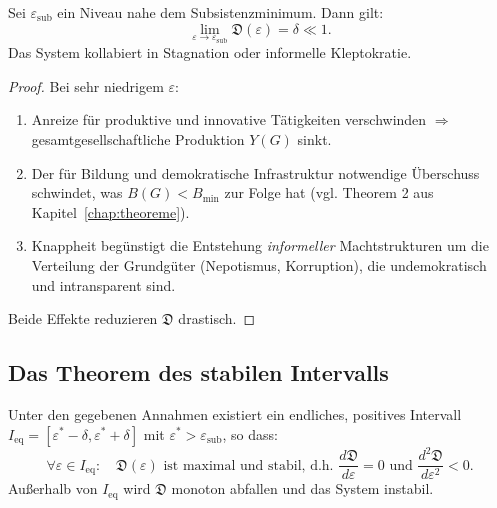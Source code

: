 \begin{theorem}
    Sei $\varepsilon_{\text{sub}}$ ein Niveau nahe dem Subsistenzminimum. Dann gilt:
    \[
    \lim_{\varepsilon \to \varepsilon_{\text{sub}}} \mathfrak{D}(\varepsilon) = \delta \ll 1.
    \]
    Das System kollabiert in Stagnation oder informelle Kleptokratie.
\end{theorem}

\begin{proof}
    Bei sehr niedrigem $\varepsilon$:
    \begin{enumerate}
        \item Anreize für produktive und innovative Tätigkeiten verschwinden $\Rightarrow$ gesamtgesellschaftliche Produktion $Y(G)$ sinkt.
        \item Der für Bildung und demokratische Infrastruktur notwendige Überschuss schwindet, was $B(G) < B_{\min}$ zur Folge hat (vgl. Theorem 2 aus Kapitel~\ref{chap:theoreme}).
        \item Knappheit begünstigt die Entstehung \emph{informeller} Machtstrukturen um die Verteilung der Grundgüter (Nepotismus, Korruption), die undemokratisch und intransparent sind.
    \end{enumerate}
    Beide Effekte reduzieren $\mathfrak{D}$ drastisch.
\end{proof}

\subsection{Das Theorem des stabilen Intervalls}

\begin{theorem}
    Unter den gegebenen Annahmen existiert ein endliches, positives Intervall $I_{\text{eq}} = [\varepsilon^* - \delta, \varepsilon^* + \delta]$ mit $\varepsilon^* > \varepsilon_{\text{sub}}$, so dass:
    \[
    \boxed{
        \forall \varepsilon \in I_{\text{eq}}: \quad \mathfrak{D}(\varepsilon) \text{ ist maximal und stabil, d.h. } \frac{d\mathfrak{D}}{d\varepsilon} = 0 \text{ und } \frac{d^2\mathfrak{D}}{d\varepsilon^2} < 0.
    }
    \]
    Außerhalb von $I_{\text{eq}}$ wird $\mathfrak{D}$ monoton abfallen und das System instabil.
\end{theorem}

